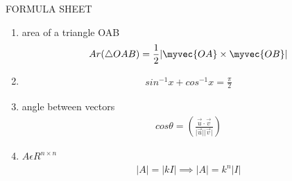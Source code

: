 
\begin{center}
    FORMULA SHEET
\end{center}
\begin{enumerate}[label=\thesubsection.\arabic*, ref=\thesubsection.\theenumi]



\item area of a triangle OAB 
\begin{align}
    Ar(\triangle OAB)= \frac{1}{2}\vert{}\myvec{OA}\times \myvec{OB}\vert{} \label{eq:ee26btech11222-prob 1}
\end{align}
\item 
\begin{align}
    sin^{-1}x+cos^{-1}x=\frac{\pi}{2} \label{eq:ee26btech11222-prob 2}
\end{align}
\item angle between vectors
\begin{align}
    cos\theta=\left(\frac{\vec{u}\cdot\vec{v}}{\vert{\vec{u}}\vert{}\vert{\vec{v}\vert{}}}\right) \label{eq:ee26btech11222-prob 7}
\end{align}

\item $A\epsilon R^{n\times n}$
\begin{align} 
    \vert{A}\vert{}=\vert{kI}\vert{} \implies \vert{A}\vert{}= k^n\vert{I}\vert{} \label{eq:ee26btech11222-prob 8}
\end{align}


\end{enumerate}
